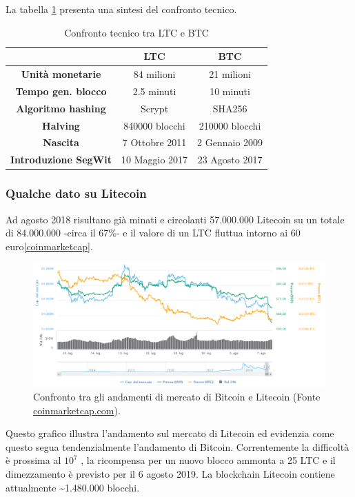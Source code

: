  La tabella \ref{ltcvsbtc} presenta una sintesi del confronto tecnico.
\cite{litecoinreview}
\begin{table}
	\begin{center}
		\begin{tabular}{|c|c|c|}
			\hline 
			& \textbf{LTC} & \textbf{BTC} \\ 
			\hline 
			\textbf{Unità monetarie}& 84 milioni & 21 milioni \\ 
			\hline 
			\textbf{Tempo gen. blocco}	& 2.5 minuti & 10 minuti \\ 
			\hline 
			\textbf{Algoritmo hashing}	& Scrypt & SHA256 \\ 
			\hline 
			\textbf{Halving}	& 840000 blocchi & 210000 blocchi \\ 
			\hline 
			\textbf{Nascita}	& 7 Ottobre 2011 & 2 Gennaio 2009 \\ 
			\hline 
			\textbf{Introduzione SegWit} & 10 Maggio 2017 & 23 Agosto 2017 \\
			\hline
		\end{tabular}
		\caption{Confronto tecnico tra LTC e BTC}
		\label{ltcvsbtc}
	\end{center}
\end{table} 

\subsubsection{Qualche dato su Litecoin}
Ad agosto 2018 risultano già minati e circolanti 57.000.000 Litecoin su un totale di 84.000.000 -circa il 67\%- e il valore di un LTC fluttua intorno ai 60 euro\ref{coinmarketcap}.

\begin{figure}[h!]
	\centering
	\includegraphics[width=1.0\linewidth]{images/LitecoinCoinMarketCap}
	\caption{Confronto tra gli andamenti di mercato di Bitcoin e Litecoin (Fonte \url{coinmarketcap.com}).}
	\label{fig:litecoincoinmarketcap}
\end{figure}


Questo grafico illustra l’andamento sul mercato di Litecoin ed evidenzia come questo segua tendenzialmente l’andamento di Bitcoin.
Correntemente la difficoltà è prossima al $10^{7}$   \cite{bitcoinwisdom}, la ricompensa per un nuovo blocco ammonta a 25 LTC e il dimezzamento è previsto per il 6 agosto 2019.
La blockchain Litecoin contiene attualmente \~{}1.480.000 blocchi.

